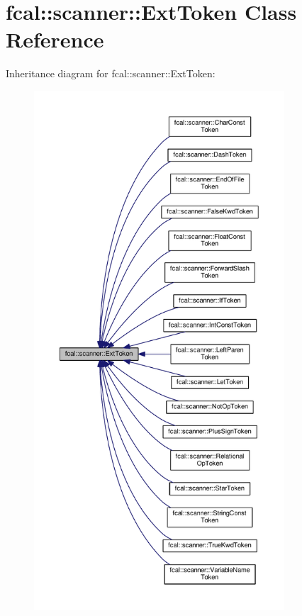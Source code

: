 \hypertarget{classfcal_1_1scanner_1_1ExtToken}{}\section{fcal\+:\+:scanner\+:\+:Ext\+Token Class Reference}
\label{classfcal_1_1scanner_1_1ExtToken}


Inheritance diagram for fcal\+:\+:scanner\+:\+:Ext\+Token\+:\nopagebreak
\begin{figure}[H]
\begin{center}
\leavevmode
\includegraphics[height=550pt]{classfcal_1_1scanner_1_1ExtToken__inherit__graph}
\end{center}
\end{figure}
